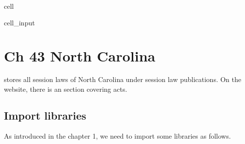 \documentclass[letterpaper,10pt,english]{jupyterBook}
\begin{document}
\begin{sphinxuseclass}{cell}\begin{sphinxVerbatimInput}

\begin{sphinxuseclass}{cell_input}
\begin{sphinxVerbatim}[commandchars=\\\{\}]
  
     


\end{sphinxVerbatim}

\end{sphinxuseclass}\end{sphinxVerbatimInput}

\end{sphinxuseclass}
\sphinxstepscope


\chapter{Ch 43 North Carolina}
\label{\detokenize{ch36:ch-43-north-carolina}}\label{\detokenize{ch36::doc}}
\sphinxAtStartPar
{} stores all session laws of North Carolina under session law publications. On the website, there is an  section covering acts.

\sphinxAtStartPar
{}


\section{Import libraries}
\label{\detokenize{ch36:import-libraries}}
\sphinxAtStartPar
As introduced in the chapter 1, we need to import some libraries as follows.
\end{document}
